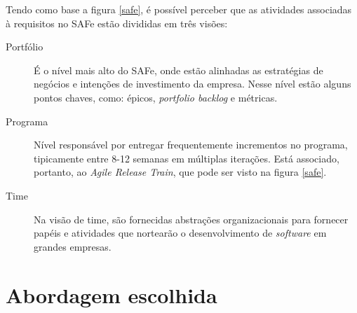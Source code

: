 Tendo como base a figura \ref{safe}, é possível perceber que as atividades associadas à requisitos no SAFe estão divididas em três visões:
\begin{description}
\item [Portfólio] É o nível mais alto do SAFe, onde estão alinhadas as estratégias de negócios e intenções de investimento da empresa. Nesse nível estão alguns pontos chaves, como: épicos, \textit{portfolio backlog} e métricas.~\cite{portfolio}
\item [Programa] Nível responsável por entregar frequentemente incrementos no programa, tipicamente entre 8-12 semanas em múltiplas iterações. Está associado, portanto, ao \textit{Agile Release Train}, que pode ser visto na figura \ref{safe}.~\cite{program}
\item [Time] Na visão de time, são fornecidas abstrações organizacionais para fornecer papéis e atividades que nortearão o desenvolvimento de \textit{software} em grandes empresas.~\cite{team}
\end{description}

\section{Abordagem escolhida}

